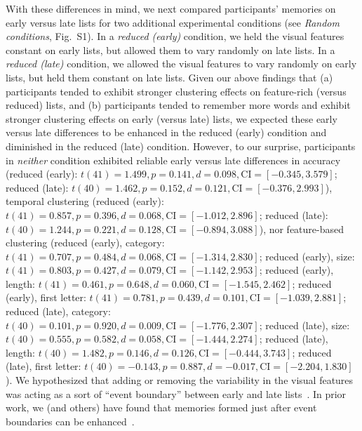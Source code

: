 \documentclass[11pt]{article}
\newcommand{\dynamicsRandom}{S1}
\begin{document}
With these differences in mind, we next compared participants' memories on
early versus late lists for two additional experimental conditions (see
\textit{Random conditions}, Fig.~\dynamicsRandom). In a \textit{reduced
(early)} condition, we held the visual features constant on early lists, but
allowed them to vary randomly on late lists. In a \textit{reduced (late)}
condition, we allowed the visual features to vary randomly on early lists, but
held them constant on late lists. Given our above findings that (a)
participants tended to exhibit stronger clustering effects on feature-rich
(versus reduced) lists, and (b) participants tended to remember more words and
exhibit stronger clustering effects on early (versus late) lists, we expected
these early versus late differences to be enhanced in the reduced (early)
condition and diminished in the reduced (late) condition. However, to our
surprise, participants in \textit{neither} condition exhibited reliable early
versus late differences in accuracy (reduced (early): $t(41) = 1.499, p =
0.141, d = 0.098, \mathrm{CI} = [-0.345, 3.579]$; reduced (late): $t(40) =
1.462, p = 0.152, d = 0.121, \mathrm{CI} = [-0.376, 2.993]$), temporal
clustering (reduced (early): $t(41) = 0.857, p = 0.396, d = 0.068, \mathrm{CI}
= [-1.012, 2.896]$; reduced (late): $t(40) = 1.244, p = 0.221, d = 0.128,
\mathrm{CI} = [-0.894, 3.088]$), nor feature-based clustering (reduced (early),
category: $t(41) = 0.707, p = 0.484, d = 0.068, \mathrm{CI} = [-1.314, 2.830]$;
reduced (early), size: $t(41) = 0.803, p = 0.427, d = 0.079, \mathrm{CI} =
[-1.142, 2.953]$; reduced (early), length: $t(41) = 0.461, p = 0.648, d =
0.060, \mathrm{CI} = [-1.545, 2.462]$; reduced (early), first letter: $t(41) =
0.781, p = 0.439, d = 0.101, \mathrm{CI} = [-1.039, 2.881]$; reduced (late),
category: $t(40) = 0.101, p = 0.920, d = 0.009, \mathrm{CI} = [-1.776, 2.307]$;
reduced (late), size: $t(40) = 0.555, p = 0.582, d = 0.058, \mathrm{CI} =
[-1.444, 2.274] $; reduced (late), length: $t(40) = 1.482, p = 0.146, d =
0.126, \mathrm{CI} = [-0.444, 3.743]$; reduced (late), first letter: $t(40) =
-0.143, p = 0.887, d = -0.017, \mathrm{CI} = [-2.204, 1.830] $). We
hypothesized that adding or removing the variability in the visual features was
acting as a sort of ``event boundary'' between early and late
lists~\citep[e.g., ][]{ClewEtal19,RadvZack17,RadvCope06}. In prior work, we
(and others) have found that memories formed just after event boundaries can be
enhanced~\citep[e.g., due to less contextual interference between pre- and
post-boundary items;][]{MannEtal16, PettEtal16, GoldEtal17, FlorEtal17}.
\end{document}
